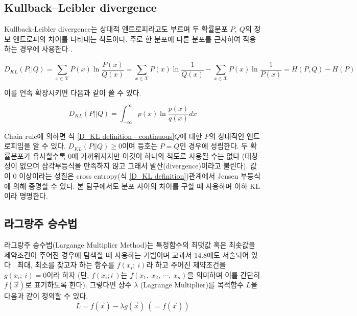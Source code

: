 


\subsection{Kullback–Leibler divergence}

Kullback-Leibler divergence는 상대적 엔트로피라고도 부르며 두 확률분포 $P,~Q$의 정보 엔트로피의 차이를 나타내는 척도이다. 주로 한 분포에 다른 분포를 근사하여 적용하는 경우에 사용한다 \cite{Wikipedia_Kullback_Liebler_Divergence}.

\begin{equation}
    D_{KL} (P||Q) = \sum_{x\in \mathcal{X}} P(x) \ln{\frac{P(x)}{Q(x)}} =  \sum_{x \in \mathcal{X}} P(x)\ln{\frac{1}{Q(x)}} - \sum_{x\in \mathcal{X}} P(x) \ln{\frac{1}{P(x)}} = H(P, Q) - H(P)
    \label{D_KL definition}
\end{equation}


이를 연속 확장시키면 다음과 같이 쓸 수 있다.

\begin{equation}
    D_{KL} (P||Q) = \int_{-\infty}^{\infty}{p(x) \ln{\frac{p(x)}{q(x)}} dx}
    \label{D_KL definition - continuous}
\end{equation}

Chain rule에 의하면 식 \ref{D_KL definition - continuous}\은 $Q$에 대한 $P$의 상대적인 엔트로피임을 알 수 있다. $D_{KL} (P||Q) \geq 0$이며 등호는 $P=Q$인 경우에 성립한다. 두 확률분포가 유사할수록 0에 가까워지지만 이것이 하나의 척도로 사용될 수는 없다 (대칭성이 없으며 삼각부등식을 만족하지 않고 그래서 발산(divergence)이라고 불린다). 값이 0 이상이라는 성질은 cross entropy(식 \ref{D_KL definition}) 관계에서 Jensen 부등식에 의해 증명할 수 있다. 본 탐구에서도 분포 사이의 차이를 구할 때 사용하며 이하 KL이라 명명한다.

\subsection{라그랑주 승수법}

라그랑주 승수법(Largange Multiplier Method)는 특정함수의 최댓값 혹은 최솟값을 제약조건이 주어진 경우에 탐색할 때 사용하는 기법이며 교과서 14.8에도 서술되어 있다 \cite{Hass_Heil_Weir_Thomas_2020}. 최대, 최소를 찾고자 하는 함수를 $f(x_{i}; ~i)$라 하고 주어진 제약조건을 $g(x_{i}; ~i) = 0$이라 하자 (단, $f(x_{i}; i~)$는 $f(x_{1}, ~x_{2}, ~\cdots, ~x_{n})$을 의미하며 이를 간단히 $f(\Vec{x})$로 표기하도록 한다). 그렇다면 상수 $\lambda$ (Lagrange Multiplier)를  목적함수 $L$을 다음과 같이 정의할 수 있다.
\begin{equation}
    L = f(\Vec{x}) - \lambda g(\Vec{x}) ~( = f(\Vec{x}) )
    \label{Lagrange Multiplier - L}
\end{equation}

